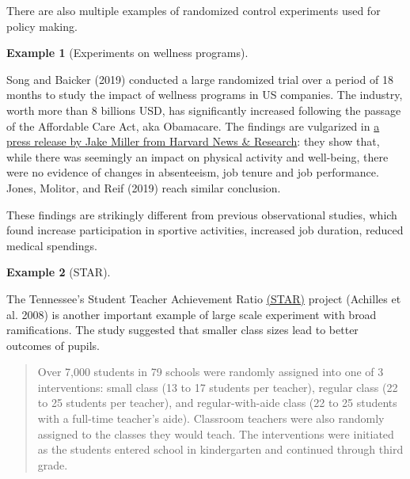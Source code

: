 \documentclass[
  11pt,
  letterpaper,
]{scrbook}
\theoremstyle{definition}
\theoremstyle{definition}
\newtheorem{example}{Example}[chapter]
\theoremstyle{remark}
\begin{document}
There are also multiple examples of randomized control experiments used
for policy making.

\begin{example}[Experiments on wellness
programs]\protect\hypertarget{exm-experimentvsobservations}{}\label{exm-experimentvsobservations}

Song and Baicker (2019) conducted a large randomized trial over a period
of 18 months to study the impact of wellness programs in US companies.
The industry, worth more than 8 billions USD, has significantly
increased following the passage of the Affordable Care Act, aka
Obamacare. The findings are vulgarized in
\href{https://hms.harvard.edu/news/do-wellness-programs-work}{a press
release by Jake Miller from Harvard News \& Research}: they show that,
while there was seemingly an impact on physical activity and well-being,
there were no evidence of changes in absenteeism, job tenure and job
performance. Jones, Molitor, and Reif (2019) reach similar conclusion.

\end{example}

These findings are strikingly different from previous observational
studies, which found increase participation in sportive activities,
increased job duration, reduced medical spendings.

\begin{example}[STAR]\protect\hypertarget{exm-Tennesseestar}{}\label{exm-Tennesseestar}

The Tennessee's Student Teacher Achievement Ratio
\href{(https://dss.princeton.edu/catalog/resource1589)}{(STAR)} project
(Achilles et al. 2008) is another important example of large scale
experiment with broad ramifications. The study suggested that smaller
class sizes lead to better outcomes of pupils.

\begin{quote}
Over 7,000 students in 79 schools were randomly assigned into one of 3
interventions: small class (13 to 17 students per teacher), regular
class (22 to 25 students per teacher), and regular-with-aide class (22
to 25 students with a full-time teacher's aide). Classroom teachers were
also randomly assigned to the classes they would teach. The
interventions were initiated as the students entered school in
kindergarten and continued through third grade.
\end{quote}

\end{example}
\end{document}
